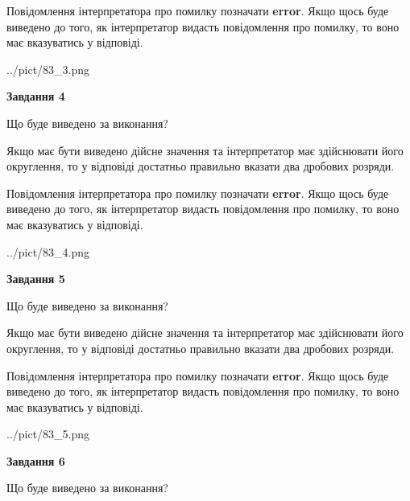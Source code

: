 \documentclass[12pt, ukrainian]{article}
\begin{document}
{\begin {Large}
Повідомлення інтерпретатора про помилку позначати \textbf{error}.
Якщо щось буде виведено до того, як інтерпретатор видасть повідомлення про помилку, 
то воно має вказуватись у відповіді. \par

\begin{center}
	{../pict/83_3.png}
\end{center}
\newpage

{\begin {center}\textbf{Завдання 4}\end {center}}\par
Що буде виведено за виконання? \par

Якщо має бути виведено дійсне значення та інтерпретатор має здійснювати його округлення, 
то у відповіді достатньо правильно вказати два дробових розряди.

Повідомлення інтерпретатора про помилку позначати \textbf{error}.
Якщо щось буде виведено до того, як інтерпретатор видасть повідомлення про помилку, 
то воно має вказуватись у відповіді. \par

\begin{center}
	{../pict/83_4.png}
\end{center}
\newpage

{\begin {center}\textbf{Завдання 5}\end {center}}\par
Що буде виведено за виконання? \par

Якщо має бути виведено дійсне значення та інтерпретатор має здійснювати його округлення, 
то у відповіді достатньо правильно вказати два дробових розряди.

Повідомлення інтерпретатора про помилку позначати \textbf{error}.
Якщо щось буде виведено до того, як інтерпретатор видасть повідомлення про помилку, 
то воно має вказуватись у відповіді. \par

\begin{center}
	{../pict/83_5.png}
\end{center}
\newpage

{\begin {center}\textbf{Завдання 6}\end {center}}\par
Що буде виведено за виконання? \par


\end{Large}}
\end{document}
